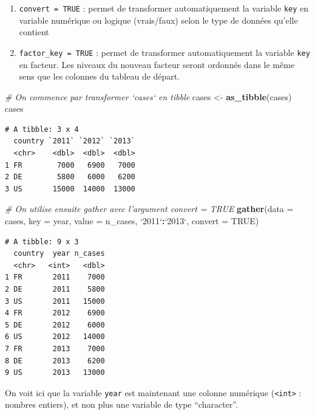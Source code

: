 \documentclass[a4paperpaper,]{article}
\newenvironment{Shaded}{\begin{snugshade}}{\end{snugshade}}
\newcommand{\KeywordTok}[1]{\textcolor[rgb]{0.13,0.29,0.53}{\textbf{#1}}}
\newcommand{\DataTypeTok}[1]{\textcolor[rgb]{0.13,0.29,0.53}{#1}}
\newcommand{\StringTok}[1]{\textcolor[rgb]{0.31,0.60,0.02}{#1}}
\newcommand{\CommentTok}[1]{\textcolor[rgb]{0.56,0.35,0.01}{\textit{#1}}}
\newcommand{\OtherTok}[1]{\textcolor[rgb]{0.56,0.35,0.01}{#1}}
\newcommand{\OperatorTok}[1]{\textcolor[rgb]{0.81,0.36,0.00}{\textbf{#1}}}
\newcommand{\NormalTok}[1]{#1}
\providecommand{\tightlist}{%
  \setlength{\itemsep}{0pt}\setlength{\parskip}{0pt}}
\theoremstyle{definition}
\theoremstyle{definition}
\theoremstyle{definition}
\theoremstyle{remark}
\begin{document}
\begin{enumerate}
\def\labelenumi{\arabic{enumi}.}
\tightlist
\item
  \texttt{convert\ =\ TRUE} : permet de transformer automatiquement la
  variable \texttt{key} en variable numérique ou logique (vrais/faux)
  selon le type de données qu'elle contient
\item
  \texttt{factor\_key\ =\ TRUE} : permet de transformer automatiquement
  la variable \texttt{key} en facteur. Les niveaux du nouveau facteur
  seront ordonnés dans le même sens que les colonnes du tableau de
  départ.
\end{enumerate}

\begin{Shaded}
\begin{Highlighting}[]
\CommentTok{# On commence par transformer `cases` en tibble}
\NormalTok{cases <-}\StringTok{ }\KeywordTok{as_tibble}\NormalTok{(cases)}
\NormalTok{cases}
\end{Highlighting}
\end{Shaded}

\begin{verbatim}
# A tibble: 3 x 4
  country `2011` `2012` `2013`
  <chr>    <dbl>  <dbl>  <dbl>
1 FR        7000   6900   7000
2 DE        5800   6000   6200
3 US       15000  14000  13000
\end{verbatim}

\begin{Shaded}
\begin{Highlighting}[]
\CommentTok{# On utilise ensuite gather avec l'argument convert = TRUE}
\KeywordTok{gather}\NormalTok{(}\DataTypeTok{data =}\NormalTok{ cases, }\DataTypeTok{key =}\NormalTok{ year, }\DataTypeTok{value =}\NormalTok{ n_cases, }\StringTok{`}\DataTypeTok{2011}\StringTok{`}\OperatorTok{:}\StringTok{`}\DataTypeTok{2013}\StringTok{`}\NormalTok{, }\DataTypeTok{convert =} \OtherTok{TRUE}\NormalTok{)}
\end{Highlighting}
\end{Shaded}

\begin{verbatim}
# A tibble: 9 x 3
  country  year n_cases
  <chr>   <int>   <dbl>
1 FR       2011    7000
2 DE       2011    5800
3 US       2011   15000
4 FR       2012    6900
5 DE       2012    6000
6 US       2012   14000
7 FR       2013    7000
8 DE       2013    6200
9 US       2013   13000
\end{verbatim}

On voit ici que la variable \texttt{year} est maintenant une colonne
numérique (\texttt{\textless{}int\textgreater{}} : nombres entiers), et
non plus une variable de type ``character''.
\end{document}
